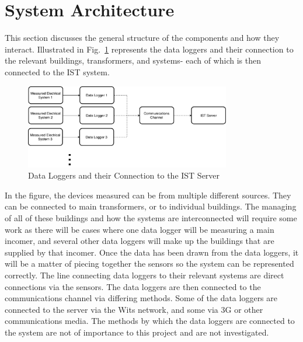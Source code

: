 \documentclass[12pt,onecolumn]{IEEEtran}
\begin{document}
\section{System Architecture} \label{sec:SystemArchitecture}

This section discusses the general structure of the components and how they interact.
Illustrated in Fig.~\ref{fig:dataloggers} represents the data loggers and their connection to the relevant buildings, transformers, and systems- each of which is then connected to the IST system.

\begin{center}
    \begin{figure}[htb]
        \centering
        \includegraphics[width=0.8\textwidth]{Data Logger.pdf}
        \caption{Data Loggers and their Connection to the IST Server}
        \label{fig:dataloggers}
    \end{figure}
\end{center}
In the figure, the devices measured can be from multiple different sources. They can be connected to main transformers, or to individual buildings. The managing of all of these buildings and how the systems are interconnected will require some work as there will be cases where one data logger will be measuring a main incomer, and several other data loggers will make up the buildings that are supplied by that incomer.
Once the data has been drawn from the data loggers, it will be a matter of piecing together the sensors so the system can be represented correctly.
The line connecting data loggers to their relevant systems are direct connections via the sensors. The data loggers are then connected to the communications channel via differing methods. Some of the data loggers are connected to the server via the Wits network, and some via 3G or other communications media. The methods by which the data loggers are connected to the system are not of importance to this project and are not investigated.
\end{document}
